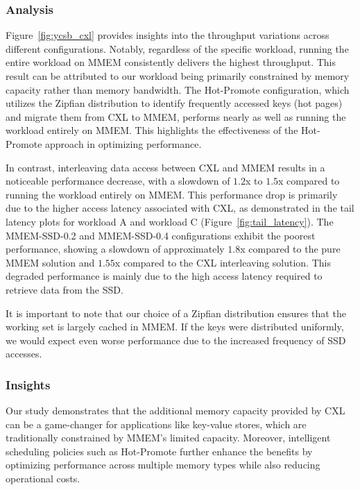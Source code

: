 \subsubsection{Analysis}
Figure~\ref{fig:ycsb_cxl} provides insights into the throughput variations across different configurations. Notably, regardless of the specific workload, running the entire workload on MMEM consistently delivers the highest throughput. This result can be attributed to our workload being primarily constrained by memory capacity rather than memory bandwidth. The Hot-Promote configuration, which utilizes the Zipfian distribution to identify frequently accessed keys (hot pages) and migrate them from CXL to MMEM, performs nearly as well as running the workload entirely on MMEM. This highlights the effectiveness of the Hot-Promote approach in optimizing performance.

In contrast, interleaving data access between CXL and MMEM results in a noticeable performance decrease, with a slowdown of $1.2$x to $1.5$x compared to running the workload entirely on MMEM. This performance drop is primarily due to the higher access latency associated with CXL, as demonstrated in the tail latency plots for workload A and workload C (Figure~\ref{fig:tail_latency}). The MMEM-SSD-0.2 and MMEM-SSD-0.4 configurations exhibit the poorest performance, showing a slowdown of approximately $1.8$x compared to the pure MMEM solution and $1.55$x compared to the CXL interleaving solution. This degraded performance is mainly due to the high access latency required to retrieve data from the SSD.

It is important to note that our choice of a Zipfian distribution ensures that the working set is largely cached in MMEM. If the keys were distributed uniformly, we would expect even worse performance due to the increased frequency of SSD accesses.

\subsubsection{Insights}
Our study demonstrates that the additional memory capacity provided by CXL can be a game-changer for applications like key-value stores, which are traditionally constrained by MMEM’s limited capacity. Moreover, intelligent scheduling policies such as Hot-Promote further enhance the benefits by optimizing performance across multiple memory types while also reducing operational costs.

